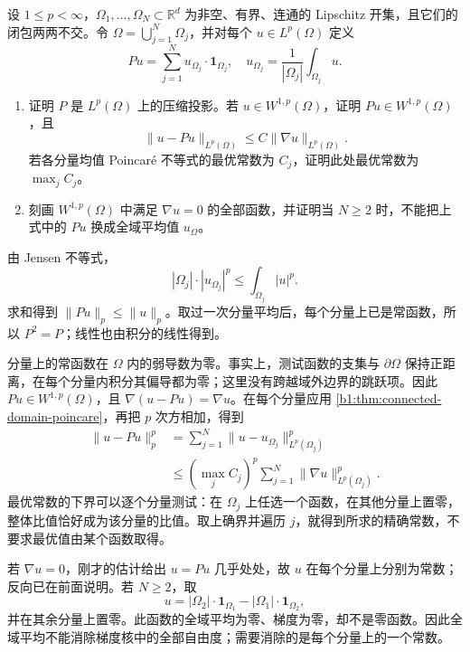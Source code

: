 \begin{exercise}\label{b1:ex:24-componentwise-poincare}
设 \(1\le p<\infty\)，\(\Omega_1,\ldots,\Omega_N\subset\mathbb R^d\) 为非空、有界、连通的 Lipschitz 开集，且它们的闭包两两不交。令
\(\Omega=\bigcup_{j=1}^N\Omega_j\)，并对每个 \(u\in L^p(\Omega)\) 定义
\[
 Pu=\sum_{j=1}^Nu_{\Omega_j}\cdot\mathbf1_{\Omega_j},
 \quad u_{\Omega_j}=\frac1{|\Omega_j|}\int_{\Omega_j}u.
\]
\begin{enumerate}
 \item\label{b1:item:24-componentwise-estimate}
 证明 \(P\) 是 \(L^p(\Omega)\) 上的压缩投影。若 \(u\in W^{1,p}(\Omega)\)，证明 \(Pu\in W^{1,p}(\Omega)\)，且
 \[
  \|u-Pu\|_{L^p(\Omega)}
       \le C\|\nabla u\|_{L^p(\Omega)}.
 \]
 若各分量均值 Poincaré 不等式的最优常数为 \(C_j\)，证明此处最优常数为
 \(\max_j C_j\)。
 \item\label{b1:item:24-componentwise-kernel}
 刻画 \(W^{1,p}(\Omega)\) 中满足 \(\nabla u=0\) 的全部函数，并证明当 \(N\ge2\) 时，不能把上式中的 \(Pu\) 换成全域平均值 \(u_\Omega\)。
\end{enumerate}
\end{exercise}
\begin{solution}
由 Jensen 不等式，
\[
 |\Omega_j|\cdot|u_{\Omega_j}|^p
       \le\int_{\Omega_j}|u|^p.
\]
求和得到 \(\|Pu\|_p\le\|u\|_p\)。取过一次分量平均后，每个分量上已是常函数，所以 \(P^2=P\)；线性也由积分的线性得到。

分量上的常函数在 \(\Omega\) 内的弱导数为零。事实上，测试函数的支集与
\(\partial\Omega\) 保持正距离，在每个分量内积分其偏导都为零；这里没有跨越域外边界的跳跃项。因此 \(Pu\in W^{1,p}(\Omega)\)，且
\(\nabla(u-Pu)=\nabla u\)。在每个分量应用%
\cref{b1:thm:connected-domain-poincare}，再把 \(p\) 次方相加，得到
\[
 \begin{aligned}
 \|u-Pu\|_p^p
 &=\sum_{j=1}^N\|u-u_{\Omega_j}\|_{L^p(\Omega_j)}^p\\
 &\le\left(\max_j C_j\right)^p
                       \sum_{j=1}^N\|\nabla u\|_{L^p(\Omega_j)}^p.
 \end{aligned}
\]
最优常数的下界可以逐个分量测试：在 \(\Omega_j\) 上任选一个函数，在其他分量上置零，整体比值恰好成为该分量的比值。取上确界并遍历 \(j\)，就得到所求的精确常数，不要求最优值由某个函数取得。

若 \(\nabla u=0\)，刚才的估计给出 \(u=Pu\) 几乎处处，故 \(u\) 在每个分量上分别为常数；反向已在前面说明。若 \(N\ge2\)，取
\[
 u=|\Omega_2|\cdot\mathbf1_{\Omega_1}
           -|\Omega_1|\cdot\mathbf1_{\Omega_2},
\]
并在其余分量上置零。此函数的全域平均为零、梯度为零，却不是零函数。因此全域平均不能消除梯度核中的全部自由度；需要消除的是每个分量上的一个常数。
\end{solution}

